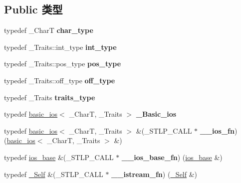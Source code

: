 \subsection*{Public 类型}
\begin{DoxyCompactItemize}
\item 
\mbox{\label{classbasic__istream_ae01251d15d1fffa40db39f40f8bb1c10}} 
typedef \+\_\+\+CharT {\bfseries char\+\_\+type}
\item 
\mbox{\label{classbasic__istream_a45ccb2f976faf74cea8de2b8158aeae6}} 
typedef \+\_\+\+Traits\+::int\+\_\+type {\bfseries int\+\_\+type}
\item 
\mbox{\label{classbasic__istream_a32c8679653dd4db54db1c58f34656280}} 
typedef \+\_\+\+Traits\+::pos\+\_\+type {\bfseries pos\+\_\+type}
\item 
\mbox{\label{classbasic__istream_a4e30886bd4748b0039c5b299365da524}} 
typedef \+\_\+\+Traits\+::off\+\_\+type {\bfseries off\+\_\+type}
\item 
\mbox{\label{classbasic__istream_a2c6797fc842cf9721bc410036e1e4222}} 
typedef \+\_\+\+Traits {\bfseries traits\+\_\+type}
\item 
\mbox{\label{classbasic__istream_afb8135744e4196613384b840bab6f684}} 
typedef \hyperlink{classbasic__ios}{basic\+\_\+ios}$<$ \+\_\+\+CharT, \+\_\+\+Traits $>$ {\bfseries \+\_\+\+Basic\+\_\+ios}
\item 
\mbox{\label{classbasic__istream_a38cf302014fdbe72fdebf79d96db5146}} 
typedef \hyperlink{classbasic__ios}{basic\+\_\+ios}$<$ \+\_\+\+CharT, \+\_\+\+Traits $>$ \&(\+\_\+\+S\+T\+L\+P\+\_\+\+C\+A\+LL $\ast$ {\bfseries \+\_\+\+\_\+ios\+\_\+fn}) (\hyperlink{classbasic__ios}{basic\+\_\+ios}$<$ \+\_\+\+CharT, \+\_\+\+Traits $>$ \&)
\item 
\mbox{\label{classbasic__istream_ac5fdda00068c2916c1c6bdc5752b81dd}} 
typedef \hyperlink{classios__base}{ios\+\_\+base} \&(\+\_\+\+S\+T\+L\+P\+\_\+\+C\+A\+LL $\ast$ {\bfseries \+\_\+\+\_\+ios\+\_\+base\+\_\+fn}) (\hyperlink{classios__base}{ios\+\_\+base} \&)
\item 
\mbox{\label{classbasic__istream_a10027386c2085e989d67b4b8abfff57e}} 
typedef \hyperlink{classbasic__istream}{\+\_\+\+Self} \&(\+\_\+\+S\+T\+L\+P\+\_\+\+C\+A\+LL $\ast$ {\bfseries \+\_\+\+\_\+istream\+\_\+fn}) (\hyperlink{classbasic__istream}{\+\_\+\+Self} \&)
\end{DoxyCompactItemize}
